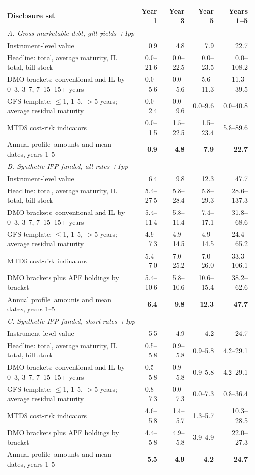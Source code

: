 \begin{tabular}{lrrrr}
\toprule
Disclosure set & Year 1 & Year 3 & Year 5 & Years 1--5 \\
\midrule
\multicolumn{5}{l}{\textit{A. Gross marketable debt, gilt yields +1pp}} \\
Instrument-level value & 0.9 & 4.8 & 7.9 & 22.7 \\
Headline: total, average maturity, IL total, bill stock & 0.0--21.6 & 0.0--22.5 & 0.0--23.5 & 0.0--108.2 \\
DMO brackets: conventional and IL by 0--3, 3--7, 7--15, 15+ years & 0.0--5.6 & 0.0--5.6 & 5.6--11.3 & 11.3--39.5 \\
GFS template: $\le$1, 1--5, $>$5 years; average residual maturity & 0.0--2.4 & 0.0--9.6 & 0.0--9.6 & 0.0--40.8 \\
MTDS cost-risk indicators & 0.0--1.5 & 1.5--22.5 & 1.5--23.4 & 5.8--89.6 \\
Annual profile: amounts and mean dates, years 1--5 & \textbf{0.9} & \textbf{4.8} & \textbf{7.9} & \textbf{22.7} \\
\midrule
\multicolumn{5}{l}{\textit{B. Synthetic IPP-funded, all rates +1pp}} \\
Instrument-level value & 6.4 & 9.8 & 12.3 & 47.7 \\
Headline: total, average maturity, IL total, bill stock & 5.4--27.5 & 5.8--28.4 & 5.8--29.3 & 28.6--137.3 \\
DMO brackets: conventional and IL by 0--3, 3--7, 7--15, 15+ years & 5.4--11.4 & 5.8--11.4 & 7.4--17.1 & 31.8--68.6 \\
GFS template: $\le$1, 1--5, $>$5 years; average residual maturity & 4.9--7.3 & 4.9--14.5 & 4.9--14.5 & 24.4--65.2 \\
MTDS cost-risk indicators & 5.4--7.0 & 7.0--25.2 & 7.0--26.0 & 33.3--106.1 \\
DMO brackets plus APF holdings by bracket & 5.4--10.6 & 5.8--10.6 & 10.6--15.4 & 38.2--62.6 \\
Annual profile: amounts and mean dates, years 1--5 & \textbf{6.4} & \textbf{9.8} & \textbf{12.3} & \textbf{47.7} \\
\midrule
\multicolumn{5}{l}{\textit{C. Synthetic IPP-funded, short rates +1pp}} \\
Instrument-level value & 5.5 & 4.9 & 4.2 & 24.7 \\
Headline: total, average maturity, IL total, bill stock & 0.5--5.8 & 0.9--5.8 & 0.9--5.8 & 4.2--29.1 \\
DMO brackets: conventional and IL by 0--3, 3--7, 7--15, 15+ years & 0.5--5.8 & 0.9--5.8 & 0.9--5.8 & 4.2--29.1 \\
GFS template: $\le$1, 1--5, $>$5 years; average residual maturity & 0.8--7.3 & 0.0--7.3 & 0.0--7.3 & 0.8--36.4 \\
MTDS cost-risk indicators & 4.6--5.8 & 1.4--5.7 & 1.3--5.7 & 10.3--28.5 \\
DMO brackets plus APF holdings by bracket & 4.4--5.8 & 4.9--5.8 & 3.9--4.9 & 22.0--27.3 \\
Annual profile: amounts and mean dates, years 1--5 & \textbf{5.5} & \textbf{4.9} & \textbf{4.2} & \textbf{24.7} \\
\bottomrule
\end{tabular}
